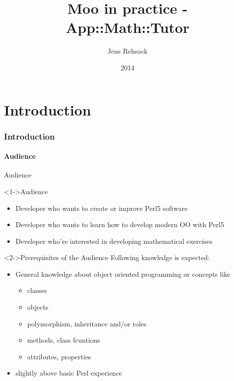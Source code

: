 \documentclass[ngerman,xcolor={table,dvipsnames},smaller,compress,hyperref={bookmarks,colorlinks}]{beamer}
\title{Moo in practice - App::Math::Tutor}
\author{Jens Rehsack}
\institute[Niederrhein.PM]{Niederrhein Perl Mongers}
\date{2014}
\begin{document}


\frame{\maketitle}

\part{Introduction}

\section{Introduction}

\subsection{Audience}

\begin{frame}[t,fragile]{Audience}
\begin{block}<1->{Audience}
\begin{itemize}
\item Developer who wants to create or improve Perl5 software
\item Developer who wants to learn how to develop modern OO with Perl5
\item Developer who're interested in developing mathematical exercises
\end{itemize}
\end{block}

\begin{block}<2->{Prerequisites of the Audience}
Following knowledge is expected:
\begin{itemize}
\item General knowledge about object oriented programming or concepts like
    \small
    \begin{itemize}
    \item classes
    \item objects
    \item polymorphism, inheritance and/or roles
    \item methods, class fcuntions
    \item attributes, properties
    \end{itemize}
    \normalsize
\item slightly above basic Perl experience
\end{itemize}
\end{block}
\end{frame}
\end{document}
